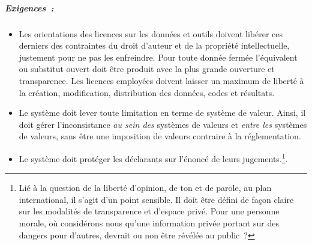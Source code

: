 
  
\subparagraph{Exigences~:}
 \begin{itemize}[noitemsep,topsep=0pt,parsep=0pt,partopsep=0pt]
  \item Les orientations des licences sur les données et outils doivent libérer ces derniers des contraintes du droit d'auteur et de la propriété intellectuelle, justement pour ne pas les enfreindre.
  Pour toute donnée fermée l'équivalent ou substitut ouvert doit être produit avec la plus grande ouverture et transparence.
  Les licences employées doivent laisser un maximum de liberté à la création, modification, distribution des données, codes et résultats. 
  
  \item Le système doit lever toute limitation en terme de système de valeur. Ainsi, il doit gérer l'inconsistance \emph{au sein des} systèmes de valeurs et \emph{entre les} systèmes de valeurs, sans être une imposition de valeurs contraire à la réglementation.
  
  \item Le système doit protéger les déclarants sur l’énoncé de leurs jugements.\footnote{
  Lié à la question de la liberté d'opinion, de ton et de parole, au plan international, il s'agit d'un point sensible.
  Il doit être défini de façon claire sur les modalités de transparence et d'espace privé.
  Pour une personne morale, où considérons nous qu'une information privée portant sur des dangers pour d'autres, devrait ou non être révélée au public~?
  }.
 \end{itemize}
 
